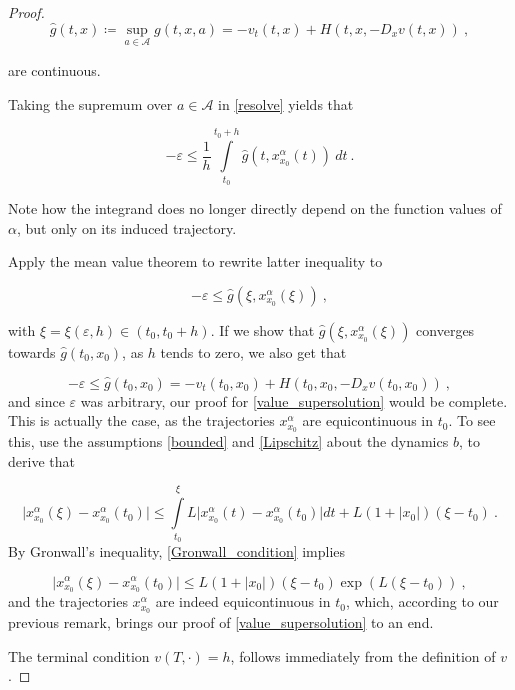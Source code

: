 \begin{theorem}
\begin{proof}
		\begin{equation*}
			\hat{g}(t, x) \coloneqq \sup\limits_{a \in \mathcal{A}} g(t, x, a) = -v_t(t, x) + H(t, x, -D_x v(t, x)) \ ,
		\end{equation*}
		
		are continuous.
		
		Taking the supremum over $ a \in \mathcal{A} $ in \eqref{resolve} yields that
		
		\begin{equation*}
			- \varepsilon \leq \frac{1}{h} \int\limits^{t_0 + h}_{t_0} \hat{g}(t, x^{\alpha}_{x_0}(t)) \ dt \ .
		\end{equation*}
		
		Note how the integrand does no longer directly depend on the function values of $ \alpha $, but only on its induced trajectory.
		
		Apply the mean value theorem to rewrite latter inequality to
		
		\begin{equation*}
			- \varepsilon \leq \hat{g}(\xi, x^{\alpha}_{x_0}(\xi)) \ ,
		\end{equation*}
		
		with $ \xi = \xi(\varepsilon, h) \in \left( t_0, t_0 + h \right) $. If we show that $ \hat{g}(\xi, x^{\alpha}_{x_0}(\xi)) $ converges towards $ \hat{g}(t_0, x_0) $, as $ h $ tends to zero, we also get that
		
		\begin{equation*}
			-\varepsilon \leq \hat{g}(t_0, x_0) = -v_t(t_0, x_0) + H(t_0, x_0, -D_x v(t_0, x_0)) \ ,
		\end{equation*}
		and since $ \varepsilon $ was arbitrary, our proof for \eqref{value_supersolution} would be complete. This is actually the case, as the trajectories $ x^{\alpha}_{x_0} $ are equicontinuous in $ t_0 $. To see this, use the assumptions \eqref{bounded} and \eqref{Lipschitz} about the dynamics $ b $, to derive that
		
		\begin{equation}
			\label{Gronwall_condition}
			\lvert x^{\alpha}_{x_0} (\xi) - x^{\alpha}_{x_0} (t_0) \rvert \leq \int\limits^{\xi}_{t_0} L \lvert x^{\alpha}_{x_0} (t) - x^{\alpha}_{x_0} (t_0) \rvert dt + L(1 + \lvert x_0 \rvert)(\xi - t_0) \ .
		\end{equation}
		By Gronwall's inequality, \eqref{Gronwall_condition} implies
		
		\begin{equation}
		\label{trajectory equicontinuous}
				\lvert x^{\alpha}_{x_0} (\xi) - x^{\alpha}_{x_0} (t_0) \rvert \leq L(1 + \lvert x_0 \rvert)(\xi - t_0) \exp(L(\xi - t_0)) \ ,
		\end{equation}
		and the trajectories $ x^{\alpha}_{x_0} $ are indeed equicontinuous in $ t_0 $, which, according to our previous remark, brings our proof of \eqref{value_supersolution} to an end.
		
		The terminal condition $ v(T, \cdot) = h $, follows immediately from the definition of $ v $.
	\end{proof}
\end{theorem}